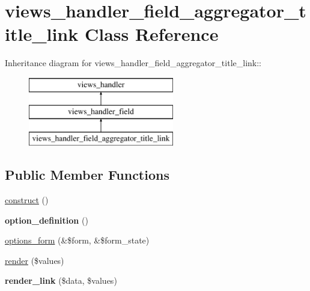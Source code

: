 \hypertarget{classviews__handler__field__aggregator__title__link}{
\section{views\_\-handler\_\-field\_\-aggregator\_\-title\_\-link Class Reference}
\label{classviews__handler__field__aggregator__title__link}
}
Inheritance diagram for views\_\-handler\_\-field\_\-aggregator\_\-title\_\-link::\begin{figure}[H]
\begin{center}
\leavevmode
\includegraphics[height=3cm]{classviews__handler__field__aggregator__title__link}
\end{center}
\end{figure}
\subsection*{Public Member Functions}
\begin{DoxyCompactItemize}
\item 
\hyperlink{classviews__handler__field__aggregator__title__link_abcde91e341b70cc842fec304c7de8376}{construct} ()
\item 
\hypertarget{classviews__handler__field__aggregator__title__link_a92ccca19cd954e8522c77dd75119d42a}{
{\bfseries option\_\-definition} ()}
\label{classviews__handler__field__aggregator__title__link_a92ccca19cd954e8522c77dd75119d42a}

\item 
\hyperlink{classviews__handler__field__aggregator__title__link_a6ebe6b2dc8c306fc32258be795f21f3b}{options\_\-form} (\&\$form, \&\$form\_\-state)
\item 
\hyperlink{classviews__handler__field__aggregator__title__link_a1b3d319f7a95e1885726a975f1755b9f}{render} (\$values)
\item 
\hypertarget{classviews__handler__field__aggregator__title__link_a2616dd2dd068d66a947a6e71ac9a47c6}{
{\bfseries render\_\-link} (\$data, \$values)}
\label{classviews__handler__field__aggregator__title__link_a2616dd2dd068d66a947a6e71ac9a47c6}

\end{DoxyCompactItemize}


